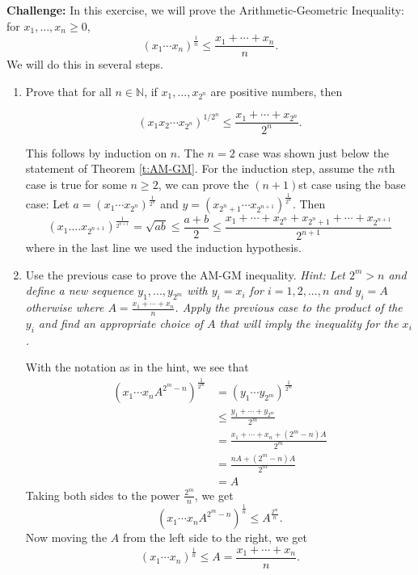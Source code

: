 \documentclass[11pt,dvipsnames]{book}
\numberwithin{equation}{section} %
\numberwithin{figure}{section} %
\numberwithin{table}{section} %
\begin{document}
\begin{exercise}
\label{ex:AMGM}
 {\bf Challenge:} In this exercise, we will prove the Arithmetic-Geometric Inequality: for $x_{1},...,x_{n}\geq 0$,
\[
(x_{1}\cdots x_{n})^{\frac{1}{n}}\leq \frac{x_{1}+\cdots + x_{n}}{n}.
\]
We will do this in several steps. 

\begin{enumerate}[label=(\alph*)]
\item Prove that for all $n\in \mathbb{N}$, if $x_{1},...,x_{2^n}$ are positive numbers, then

\[
(x_{1}x_{2}\cdots x_{2^n})^{1/2^{n}} \leq \frac{x_{1}+\cdots + x_{2^n}}{2^n}.
\]

\begin{solution}
This follows by induction on $n$. The $n=2$ case was shown just below the statement of Theorem \ref{t:AM-GM}. For the induction step, assume the $n$th case is true for some $n\geq 2$, we can prove the $(n+1)$st case using the base case: Let $a=(x_{1}\cdots x_{2^{n}})^{\frac{1}{2^{n}}}$ and $y=(x_{2^{n}+1}\cdots x_{2^{n+1}})^{\frac{1}{2^{n}}}$. Then
\[
(x_{1}....x_{2^{n+1}})^{\frac{1}{2^{n+1}}}
=\sqrt{ab}\leq \frac{a+b}{2}
\leq \frac{x_{1}+\cdots + x_{2^{n}}+x_{2^{n}+1}+\cdots + x_{2^{n+1}}}{2^{n+1}}\]
where in the last line we used the induction hypothesis.\end{solution}

\item Use  the previous case to prove the AM-GM inequality. {\it Hint: Let $2^{m}>n$ and define a new sequence $y_{1},...,y_{2^{m}}$ with $y_{i}=x_{i}$ for $i=1,2,...,n$ and $y_{i}=A$ otherwise where $A=\frac{x_{1}+\cdots + x_{n}}{n}$. Apply the previous case to the product of the $y_{i}$ and find an appropriate choice of $A$ that will imply the inequality for the $x_{i}$.}

\begin{solution}
With the notation as in the hint, we see that
\begin{align*}
(x_{1}\cdots x_{n}A^{2^{m}-n})^{\frac{1}{2^{m}}} 
& = (y_{1}\cdots y_{2^{m}})^{\frac{1}{2^{m}}}\\
& \leq \frac{y_{1}+\cdots + y_{2^{m}}}{2^{m}}\\
& =\frac{x_{1}+\cdots + x_{n} + (2^{m}-n)A}{2^{m}}\\
& = \frac{nA+(2^{m}-n)A}{2^{m}}\\
& = A
\end{align*}
Taking both sides to the power $\frac{2^{m}}{n}$, we get
\[
(x_{1}\cdots x_{n}A^{2^{m}-n})^{\frac{1}{n}}
\leq A^{\frac{2^{m}}{n}}.
\]
Now moving the $A$ from the left side to the right, we get
\[
(x_{1}\cdots x_{n})^{\frac{1}{n}}\leq A=\frac{x_{1}+\cdots + x_{n}}{n}.
\]
\end{solution}
\end{enumerate}
\end{exercise}
\end{document}
